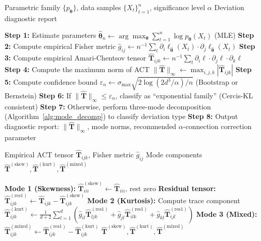 \documentclass[12pt,a4paper]{article}
\theoremstyle{plain}
\theoremstyle{definition}
\theoremstyle{remark}
\newcommand{\Cercis}{\textsf{Cercis}}
\newcommand{\ACT}{\mathbf{T}}    %
\begin{document}
\begin{algorithm}[h]
\caption{Non-Exponential-Family \Cercis-KL Deviation Diagnostic}
\label{alg:diagnostic}
\begin{algorithmic}[1]
\Require Parametric family $\{p_{\bm{\theta}}\}$, data samples $\{X_t\}_{t=1}^n$, significance level $\alpha$
\Ensure Deviation diagnostic report

\State \textbf{Step 1:} Estimate parameters $\hat{\bm{\theta}}_n \gets \arg\max_{\bm{\theta}} \sum_{t=1}^n \log p_{\bm{\theta}}(X_t)$ (MLE)
\State \textbf{Step 2:} Compute empirical Fisher metric $\hat{g}_{ij} \gets n^{-1}\sum_t \partial_i \ell_{\hat{\bm{\theta}}}(X_t) \cdot \partial_j \ell_{\hat{\bm{\theta}}}(X_t)$
\State \textbf{Step 3:} Compute empirical Amari-Chentsov tensor $\widehat{\ACT}_{ijk} \gets n^{-1}\sum_t \partial_i \ell \cdot \partial_j \ell \cdot \partial_k \ell$
\State \textbf{Step 4:} Compute the maximum norm of ACT $\|\widehat{\ACT}\|_{\infty} \gets \max_{i,j,k} |\widehat{\ACT}_{ijk}|$
\State \textbf{Step 5:} Compute confidence bound $\varepsilon_n \gets \sigma_{\max}\sqrt{2\log(2d^3/\alpha)/n}$ (Bootstrap or Bernstein)
\State \textbf{Step 6:} If $\|\widehat{\ACT}\|_{\infty} \leq \varepsilon_n$, classify as ``exponential family'' (\Cercis-KL consistent)
\State \textbf{Step 7:} Otherwise, perform three-mode decomposition (Algorithm~\ref{alg:mode_decomp}) to classify deviation type
\State \textbf{Step 8:} Output diagnostic report: $\|\widehat{\ACT}\|_{\infty}$, mode norms, recommended $\alpha$-connection correction parameter
\end{algorithmic}
\end{algorithm}

\begin{algorithm}[h]
\caption{Three-Mode Decomposition Algorithm}
\label{alg:mode_decomp}
\begin{algorithmic}[1]
\Require Empirical ACT tensor $\widehat{\ACT}_{ijk}$, Fisher metric $\hat{g}_{ij}$
\Ensure Mode components $\widehat{\ACT}^{(\mathrm{skew})}, \widehat{\ACT}^{(\mathrm{kurt})}, \widehat{\ACT}^{(\mathrm{mixed})}$

\State \textbf{Mode 1 (Skewness):} $\widehat{\ACT}^{(\mathrm{skew})}_{iii} \gets \widehat{\ACT}_{iii}$, rest zero
\State \textbf{Residual tensor:} $\widehat{\ACT}^{(\mathrm{res1})}_{ijk} \gets \widehat{\ACT}_{ijk} - \widehat{\ACT}^{(\mathrm{skew})}_{ijk}$
\State \textbf{Mode 2 (Kurtosis):} Compute trace component
    \State $\widehat{\ACT}^{(\mathrm{kurt})}_{ijk} \gets \frac{1}{d+2}\sum_{l=1}^d (\hat{g}_{il}\widehat{\ACT}^{(\mathrm{res1})}_{ljk} + \hat{g}_{jl}\widehat{\ACT}^{(\mathrm{res1})}_{ilk} + \hat{g}_{kl}\widehat{\ACT}^{(\mathrm{res1})}_{ijl})$
\EndFor
\State \textbf{Mode 3 (Mixed):} $\widehat{\ACT}^{(\mathrm{mixed})}_{ijk} \gets \widehat{\ACT}^{(\mathrm{res1})}_{ijk} - \widehat{\ACT}^{(\mathrm{kurt})}_{ijk}$
\State \Return $\widehat{\ACT}^{(\mathrm{skew})}, \widehat{\ACT}^{(\mathrm{kurt})}, \widehat{\ACT}^{(\mathrm{mixed})}$
\end{algorithmic}
\end{algorithm}
\end{document}
